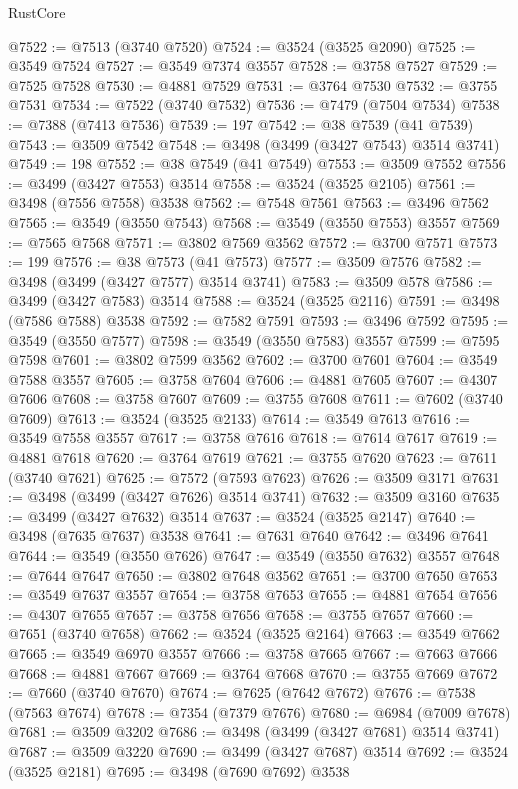 \begin{lexlean}{RustCore}
\begin{coremodule}
@7522 := @7513 (@3740 @7520)
@7524 := @3524 (@3525 @2090)
@7525 := @3549 @7524
@7527 := @3549 @7374 @3557
@7528 := @3758 @7527
@7529 := @7525 @7528
@7530 := @4881 @7529
@7531 := @3764 @7530
@7532 := @3755 @7531
@7534 := @7522 (@3740 @7532)
@7536 := @7479 (@7504 @7534)
@7538 := @7388 (@7413 @7536)
@7539 := 197
@7542 := @38 @7539 (@41 @7539)
@7543 := @3509 @7542
@7548 := @3498 (@3499 (@3427 @7543) @3514 @3741)
@7549 := 198
@7552 := @38 @7549 (@41 @7549)
@7553 := @3509 @7552
@7556 := @3499 (@3427 @7553) @3514
@7558 := @3524 (@3525 @2105)
@7561 := @3498 (@7556 @7558) @3538
@7562 := @7548 @7561
@7563 := @3496 @7562
@7565 := @3549 (@3550 @7543)
@7568 := @3549 (@3550 @7553) @3557
@7569 := @7565 @7568
@7571 := @3802 @7569 @3562
@7572 := @3700 @7571
@7573 := 199
@7576 := @38 @7573 (@41 @7573)
@7577 := @3509 @7576
@7582 := @3498 (@3499 (@3427 @7577) @3514 @3741)
@7583 := @3509 @578
@7586 := @3499 (@3427 @7583) @3514
@7588 := @3524 (@3525 @2116)
@7591 := @3498 (@7586 @7588) @3538
@7592 := @7582 @7591
@7593 := @3496 @7592
@7595 := @3549 (@3550 @7577)
@7598 := @3549 (@3550 @7583) @3557
@7599 := @7595 @7598
@7601 := @3802 @7599 @3562
@7602 := @3700 @7601
@7604 := @3549 @7588 @3557
@7605 := @3758 @7604
@7606 := @4881 @7605
@7607 := @4307 @7606
@7608 := @3758 @7607
@7609 := @3755 @7608
@7611 := @7602 (@3740 @7609)
@7613 := @3524 (@3525 @2133)
@7614 := @3549 @7613
@7616 := @3549 @7558 @3557
@7617 := @3758 @7616
@7618 := @7614 @7617
@7619 := @4881 @7618
@7620 := @3764 @7619
@7621 := @3755 @7620
@7623 := @7611 (@3740 @7621)
@7625 := @7572 (@7593 @7623)
@7626 := @3509 @3171
@7631 := @3498 (@3499 (@3427 @7626) @3514 @3741)
@7632 := @3509 @3160
@7635 := @3499 (@3427 @7632) @3514
@7637 := @3524 (@3525 @2147)
@7640 := @3498 (@7635 @7637) @3538
@7641 := @7631 @7640
@7642 := @3496 @7641
@7644 := @3549 (@3550 @7626)
@7647 := @3549 (@3550 @7632) @3557
@7648 := @7644 @7647
@7650 := @3802 @7648 @3562
@7651 := @3700 @7650
@7653 := @3549 @7637 @3557
@7654 := @3758 @7653
@7655 := @4881 @7654
@7656 := @4307 @7655
@7657 := @3758 @7656
@7658 := @3755 @7657
@7660 := @7651 (@3740 @7658)
@7662 := @3524 (@3525 @2164)
@7663 := @3549 @7662
@7665 := @3549 @6970 @3557
@7666 := @3758 @7665
@7667 := @7663 @7666
@7668 := @4881 @7667
@7669 := @3764 @7668
@7670 := @3755 @7669
@7672 := @7660 (@3740 @7670)
@7674 := @7625 (@7642 @7672)
@7676 := @7538 (@7563 @7674)
@7678 := @7354 (@7379 @7676)
@7680 := @6984 (@7009 @7678)
@7681 := @3509 @3202
@7686 := @3498 (@3499 (@3427 @7681) @3514 @3741)
@7687 := @3509 @3220
@7690 := @3499 (@3427 @7687) @3514
@7692 := @3524 (@3525 @2181)
@7695 := @3498 (@7690 @7692) @3538

\end{coremodule}
\end{lexlean}
